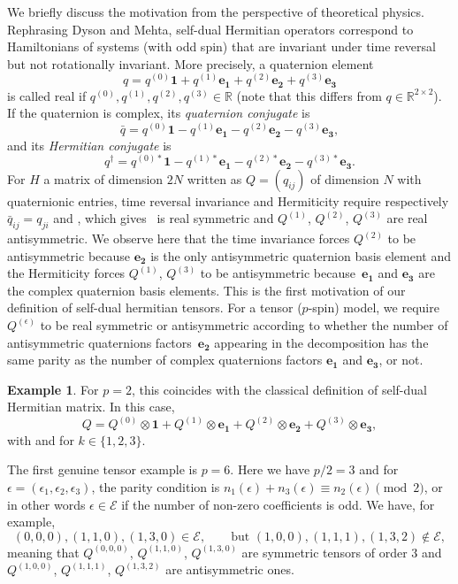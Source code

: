 \documentclass[pdftex]{sigma}
\numberwithin{equation}{section}
\theoremstyle{definition}
\newtheorem{Example}[Theorem]{Example}
\begin{document}
We briefly discuss the motivation from the perspective of theoretical physics. Rephrasing Dyson and Mehta, self-dual Hermitian operators correspond to Hamiltonians of systems (with odd spin) that are invariant under time reversal but not rotationally invariant. More precisely, a quaternion element
\[ q = q^{(0)} \mathbf{1} + q^{(1)} \mathbf{e_1}+ q^{(2)}\mathbf{e_2} + q^{(3)}\mathbf{e_3} \]
is called real if $q^{(0)},q^{(1)},q^{(2)},q^{(3)} \in \mathbb{R}$ \big(note that this differs from $q \in \mathbb{R}^{2 \times 2}$\big). If the quaternion is complex, its {\em quaternion conjugate} is
\[ \bar q = q^{(0)} \mathbf{1} - q^{(1)} \mathbf{e_1} - q^{(2)}\mathbf{e_2} - q^{(3)}\mathbf{e_3}, \]
and its {\em Hermitian conjugate} is
\[ q^\dagger = q^{(0)*} \mathbf{1} - q^{(1)*} \mathbf{e_1} - q^{(2)*}\mathbf{e_2} - q^{(3)*}\mathbf{e_3} . \]
For $H$ a matrix of dimension $2N$ written as $Q=(q_{ij})$ of dimension $N$ with quaternionic entries, time reversal invariance and Hermiticity require respectively
$\bar q_{i j} = q_{ji}$ and ,
which gives~ is real symmetric and $Q^{(1)}$, $Q^{(2)}$, $Q^{(3)}$ are real antisymmetric. We observe here that the time invariance forces $Q^{(2)}$ to be antisymmetric because $\mathbf{e_2}$ is the only antisymmetric quaternion basis element and the Hermiticity forces $Q^{(1)}$, $Q^{(3)}$ to be antisymmetric because~$\mathbf{e_1}$ and $\mathbf{e_3}$ are the complex quaternion basis elements.
This is the first motivation of our definition of self-dual hermitian tensors. For a tensor ($p$-spin) model, we require $Q^{(\epsilon)}$ to be real symmetric or antisymmetric according to whether the number of antisymmetric quaternions factors~$\mathbf{e_2}$ appearing in the decomposition  has the same parity as the number of complex quaternions factors $\mathbf{e_1}$ and $\mathbf{e_3}$, or not.

\begin{Example}
For $p=2$, this coincides with the classical definition of self-dual Hermitian matrix. In this case,
\[ Q= Q^{(0)} \otimes \mathbf{1} + Q^{(1)} \otimes \mathbf{e_{1}} + Q^{(2)} \otimes \mathbf{e_{2}} + Q^{(3)} \otimes \mathbf{e_{3}}, \]
with  and  for $k \in \{1,2,3 \}$.

The first genuine tensor example is $p=6$. Here we have $p/2=3$ and for $\epsilon=(\epsilon_1,\epsilon_2,\epsilon_3)$, the parity condition is $n_1(\epsilon)+n_3(\epsilon) \equiv n_2(\epsilon) \pmod 2$, or in other words $\epsilon \in \mathcal{E}$ if the number of non-zero coefficients is odd. We have, for example,
\[ (0,0,0),(1,1,0),(1,3,0) \in \mathcal{E} ,\qquad  \text{but } (1,0,0),(1,1,1),(1,3,2) \notin \mathcal{E}, \]
meaning that $Q^{(0,0,0)}$, $Q^{(1,1,0)}$, $Q^{(1,3,0)}$ are symmetric tensors of order $3$ and $Q^{(1,0,0)}$, $Q^{(1,1,1)}$, $Q^{(1,3,2)}$ are antisymmetric ones.
\end{Example}
\end{document}
